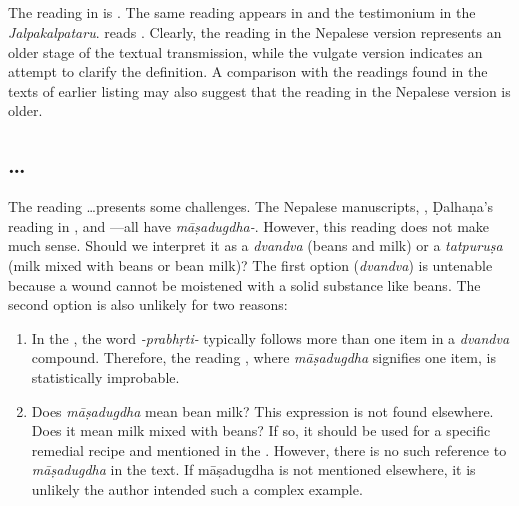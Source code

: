 \subsection{}

The reading in  is 
. 
The same reading appears in  
and the testimonium in the \emph{Jalpakalpataru}. 
 reads 
. 
Clearly, the reading in the Nepalese version represents 
an older stage of the textual transmission, 
while the vulgate version indicates an attempt to clarify the definition. 
A comparison with the readings found in the texts of earlier listing 
may also suggest that the reading in the Nepalese version is older. 
	
\subsection{\ldots{}}

The reading \ldots presents some challenges. 
The Nepalese manuscripts, \Su{}{}, Ḍalhaṇa's reading in \Su{}{}, 
and ---all have \emph{māṣadugdha-}.
However, this reading does not make much sense. 
Should we interpret it as a \emph{dvandva} (beans and milk) 
or a \emph{tatpuruṣa} (milk mixed with beans or bean milk)? 
The first option (\emph{dvandva}) is untenable because 
a wound cannot be moistened with a solid substance like beans. 
The second option is also unlikely for two reasons:

\begin{enumerate}
	\item In the \SS, the word \emph{-prabhṛti-} typically follows 
	more than one item in a \emph{dvandva} compound. 
	Therefore, the reading , 
	where \emph{māṣadugdha} signifies one item, 
	is statistically improbable.
	
	\item Does \emph{māṣadugdha} mean bean milk? 
	This expression is not found elsewhere. 
	Does it mean milk mixed with beans? 
	If so, it should be used for a specific remedial recipe 
	and mentioned in the \SS. 
	However, there is no such reference to \emph{māṣadugdha} in the text. 
	If māṣadugdha is not mentioned elsewhere, 
	it is unlikely the author intended such a complex example.
	
\end{enumerate}

